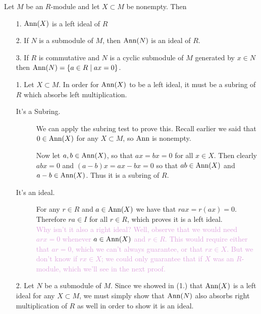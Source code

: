 \begin{proposition}
    Let $M$ be an $R$-module and let $X \subset M$ be nonempty. Then 
    \begin{itemize}
        \item[1.] $\mbox{Ann}(X)$ is a left ideal of $R$
        \item[2.] If $N$ is a submodule of $M$, then $\mbox{Ann}(N)$
        is an ideal of $R$.
        \item[3.] If $R$ is commutative and $N$ is a cyclic submodule of $M$ generated by $x \in
        N$ then $\mbox{Ann}(N) = \{a \in R \mid ax = 0 \}$.
    \end{itemize}
\end{proposition}

\begin{prf}
    \begin{itemize}
        \item[1.] 
        Let $X \subset M$. In order for $\mbox{Ann}(X)$ to be a left ideal, it must be a subring of
        $R$ which absorbs left multiplication. 
        \begin{description}
            \item[It's a Subring.] We can apply the subring test to
            prove this. Recall earlier we said that $0 \in \mbox{Ann}(X)$
            for any $X \subset M$, so $\mbox{Ann}$ is nonempty. 
            
            Now let $a, b \in \mbox{Ann}(X)$, so that $ax = bx = 0$ for all
            $x \in X$. Then clearly $abx = 0$ and $(a - b)x = ax -bx
            = 0$ so that $ab \in \mbox{Ann}(X)$ and $a-b \in \mbox{Ann}(X)$. Thus
            it is a subring of $R$.

            \item[It's an ideal.] For any $r \in R$ and $a \in
            \mbox{Ann}(X)$ we have that $rax = r(ax) = 0$. Therefore
            $ra\in I$ for all $r \in R$, which proves it is a left
            ideal. 
            \\
            \textcolor{Plum}{Why isn't it also a right ideal? Well,
            observe that we would need $arx = 0$ whenever $a \in
            \mbox{Ann}(X)$ and $r \in R$. This would require either that
            $ar = 0$, which we can't always guarantee, or that $rx
            \in X$. But we don't know if $rx \in X$; we could only
            guarantee that if $X$ was an $R$-module, which we'll
            see in the next proof.
            }
        \end{description} 

        \item[2.] Let $N$ be a submodule of $M$. Since we showed
        in (1.) that $\mbox{Ann}(X)$ is a left
        ideal for any $X \subset M$, we must simply show that
        $\mbox{Ann}(N)$ also absorbs right multiplication of $R$ as well in
        order to show it is an ideal.


\end{itemize}
\end{prf}
